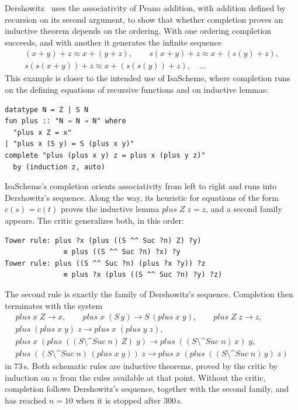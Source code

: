\documentclass[preprint,12pt]{elsarticle}
\newcommand{\rw}{\to}
\newcommand{\pp}{\mathbin{\texttt{\^{}\^{}}}}     %
\newcommand{\fp}[2]{(#1 \pp #2)}                  %
\newcommand{\Suc}{\mathit{Suc}}
\begin{document}
Dershowitz~\cite[Section~4.4]{Dershowitz89} uses the associativity of
Peano addition, with addition defined by recursion on its second argument,
to show that whether completion proves an inductive theorem depends on the
ordering. With one ordering completion succeeds, and with another it
generates the infinite sequence
\begin{gather*}
  (x+y)+z \approx x+(y+z),\qquad s(x+y)+z \approx x+(s(y)+z),\\
  s(s(x+y))+z \approx x+(s(s(y))+z),\quad \ldots
\end{gather*}
This example is closer to the intended use of IsaScheme, where completion
runs on the defining equations of recursive functions and on inductive
lemmas:
\begin{lstlisting}
datatype N = Z | S N
fun plus :: "N ⇒ N ⇒ N" where
  "plus x Z = x"
| "plus x (S y) = S (plus x y)"
complete "plus (plus x y) z = plus x (plus y z)"
  by (induction z, auto)
\end{lstlisting}
IsaScheme's completion orients associativity from left to right and runs
into Dershowitz's sequence. Along the way, its heuristic for equations of
the form $c(s) = c(t)$ proves the inductive lemma $\mathit{plus}\;Z\;z = z$,
and a second family appears. The critic generalizes both, in this order:
\begin{lstlisting}[language={}]
Tower rule: plus ?x (plus ((S ^^ Suc ?n) Z) ?y)
              ≡ plus ((S ^^ Suc ?n) ?x) ?y
Tower rule: plus ((S ^^ Suc ?n) (plus ?x ?y)) ?z
              ≡ plus ?x (plus ((S ^^ Suc ?n) ?y) ?z)
\end{lstlisting}
The second rule is exactly the family of Dershowitz's sequence. Completion
then terminates with the system
\begin{gather*}
  \mathit{plus}\;x\;Z \rw x, \qquad
  \mathit{plus}\;x\;(S\,y) \rw S\,(\mathit{plus}\;x\;y), \qquad
  \mathit{plus}\;Z\;z \rw z, \\
  \mathit{plus}\;(\mathit{plus}\;x\;y)\;z \rw \mathit{plus}\;x\;(\mathit{plus}\;y\;z), \\
  \mathit{plus}\;x\;(\mathit{plus}\;(\fp{S}{\Suc\;n}\,Z)\;y)
     \rw \mathit{plus}\;(\fp{S}{\Suc\;n}\,x)\;y, \\
  \mathit{plus}\;(\fp{S}{\Suc\;n}\,(\mathit{plus}\;x\;y))\;z
     \rw \mathit{plus}\;x\;(\mathit{plus}\;(\fp{S}{\Suc\;n}\,y)\;z)
\end{gather*}
in 73\,s. Both schematic rules are inductive theorems, proved by the
critic by induction on $n$ from the rules available at that point. Without
the critic, completion follows Dershowitz's sequence, together with the
second family, and has reached $n = 10$ when it is stopped after 300\,s.
\end{document}
